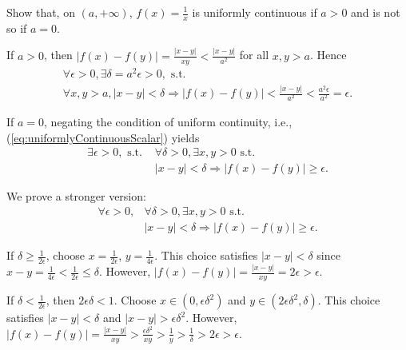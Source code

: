 \begin{exc}
  \label{exc:1/xNotUniformlyContinuous}
  Show that, on $(a,+\infty)$,
  $f(x)=\frac{1}{x}$ is uniformly continuous
   if $a>0$ 
   and is not so if $a=0$.
\end{exc}
\begin{solution}
  If $a>0$, then
  $|f(x)-f(y)|=\frac{|x-y|}{xy} %
  <\frac{|x-y|}{a^2}$ for all $x,y>a$. Hence
   \begin{displaymath}
     \begin{array}{l}
       \forall \epsilon>0,\exists \delta=a^{2}\epsilon>0,
      \text{ s.t. }\\
      \forall x,y>a,|x-y|<\delta \Rightarrow
      |f(x)-f(y)|<\frac{|x-y|}{a^2}<\frac{a^2 \epsilon}{a^2}=\epsilon.
     \end{array}
   \end{displaymath}

  If $a=0$, negating the condition
   of uniform continuity,
   i.e., (\ref{eq:uniformlyContinuousScalar}) yields
   \begin{align*}
     \exists \epsilon>0, \text{ s.t. } &\forall \delta>0,
       \exists x,y>0 \text{ s.t. }\\
       &|x-y|<\delta \Rightarrow |f(x)-f(y)|\ge \epsilon.
   \end{align*}

   We prove a stronger version:
   \begin{align*}
      \forall \epsilon>0, &\forall \delta>0,
       \exists x,y>0 \text{ s.t. }\\
       &|x-y|<\delta \Rightarrow |f(x)-f(y)|\ge \epsilon.
   \end{align*}

  If $\delta\ge \frac{1}{2\epsilon}$,
   choose $x=\frac{1}{2\epsilon}$, $y=\frac{1}{4\epsilon}$.
  This choice satisfies $|x-y|<\delta$
   since $x-y=\frac{1}{4\epsilon}<\frac{1}{2\epsilon}\le \delta$.
  However, $|f(x)-f(y)|=\frac{|x-y|}{xy}=2\epsilon>\epsilon$.

  If $\delta< \frac{1}{2\epsilon}$,
   then $2\epsilon\delta<1$.
  Choose $x\in (0, \epsilon\delta^2)$
   and $y\in (2\epsilon\delta^2, \delta)$.
  This choice satisfies $|x-y|<\delta$
   and $|x-y|>\epsilon\delta^2$.
  However, 
   $|f(x)-f(y)|=\frac{|x-y|}{xy}>\frac{\epsilon\delta^2}{xy}
   > \frac{1}{y} > \frac{1}{\delta} > 2\epsilon> \epsilon$.
\end{solution}


